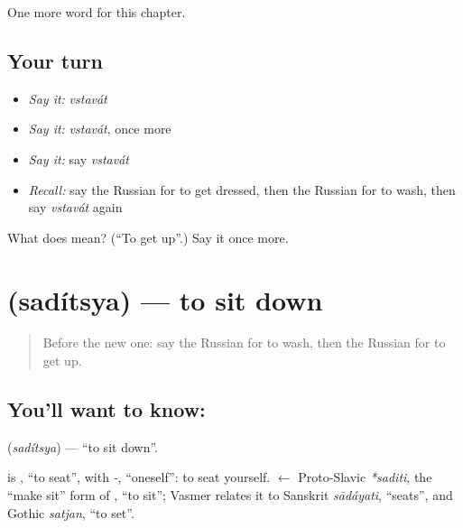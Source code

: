 \begin{grammarlens}[title={What you've built}]
One more word for this chapter.
\end{grammarlens}

\subsection*{Your turn}
\begin{itemize}
\raggedright
  \item \emph{Say it:} \emph{vstavát}
  \item \emph{Say it:} \emph{vstavát}, once more
  \item \emph{Say it:} say \emph{vstavát}
  \item \emph{Recall:} say the Russian for to get dressed, then the Russian for to wash, then say \emph{vstavát} again
\end{itemize}

\begin{tcolorbox}[breakable,colback=teal!4,colframe=teal!35!black,title={Before you move on}]
What does  mean? (\textquotedblleft{}To get up\textquotedblright{}.) Say it once more.
\end{tcolorbox}
\section[\texorpdfstring{\ru{садиться} (sadítsya)}{садиться (sadítsya)}]{ (sadítsya) — to sit down}

\label{lesson:RU-C132-to-sit-down}



\begin{quote}
Before the new one: say the Russian for to wash, then the Russian for to get up.
\end{quote}

\subsection*{You'll want to know: }
\textbf{} (\emph{sadítsya}) — \textquotedblleft{}to sit down\textquotedblright{}.

\begin{cousinweb}
\textbf{} is \emph{}, \textquotedblleft{}to seat\textquotedblright{}, with \emph{-}, \textquotedblleft{}oneself\textquotedblright{}: to seat yourself. \emph{} $\leftarrow$ Proto-Slavic \emph{*saditi}, the \textquotedblleft{}make sit\textquotedblright{} form of \emph{}, \textquotedblleft{}to sit\textquotedblright{}; Vasmer relates it to Sanskrit \emph{sādáyati}, \textquotedblleft{}seats\textquotedblright{}, and Gothic \emph{satjan}, \textquotedblleft{}to set\textquotedblright{}.
\end{cousinweb}

